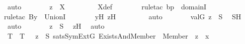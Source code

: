 \begin{isabellebody}
\ auto\isanewline
\ \ \ \ \isamarkupfalse%
\ \isamarkupfalse%
\ {\isachardoublequoteopen}z{\isacharprime}{\kern0pt}\ {\isasymin}\ X{\isachardoublequoteclose}\ \isanewline
\ \ \ \ \ \ \isamarkupfalse%
\ X{\isacharunderscore}{\kern0pt}def\ \isanewline
\ \ \ \ \ \ \isamarkupfalse%
{\isacharparenleft}{\kern0pt}rule{\isacharunderscore}{\kern0pt}tac\ b{\isacharequal}{\kern0pt}p\ \ domainI{\isacharparenright}{\kern0pt}\isanewline
\ \ \ \ \ \ \isamarkupfalse%
{\isacharparenleft}{\kern0pt}rule{\isacharunderscore}{\kern0pt}tac\ B{\isacharequal}{\kern0pt}y{\isacharprime}{\kern0pt}\ \ UnionI{\isacharparenright}{\kern0pt}\isanewline
\ \ \ \ \ \ \isamarkupfalse%
\ y{\isacharprime}{\kern0pt}H\ z{\isacharprime}{\kern0pt}H\ \isanewline
\ \ \ \ \ \ \isamarkupfalse%
\ auto\isanewline
\ \ \ \ \isamarkupfalse%
\ \isamarkupfalse%
\ {\isachardoublequoteopen}val{\isacharparenleft}{\kern0pt}G{\isacharcomma}{\kern0pt}\ z{\isacharprime}{\kern0pt}{\isacharparenright}{\kern0pt}\ {\isasymin}\ S{\isachardoublequoteclose}\ \isamarkupfalse%
\ SH\ \isamarkupfalse%
\ auto\isanewline
\ \ \ \ \isamarkupfalse%
\ \isamarkupfalse%
\ {\isachardoublequoteopen}z\ {\isasymin}\ S{\isachardoublequoteclose}\ \isamarkupfalse%
\ z{\isacharprime}{\kern0pt}H\ \isamarkupfalse%
\ auto\isanewline
\ \ \isamarkupfalse%
\isanewline
\isanewline
\ \ \isamarkupfalse%
\ T\ \ {\isachardoublequoteopen}T\ {\isasymequiv}\ {\isacharbraceleft}{\kern0pt}\ z\ {\isasymin}\ S{\isachardot}{\kern0pt}\ sats{\isacharparenleft}{\kern0pt}SymExt{\isacharparenleft}{\kern0pt}G{\isacharparenright}{\kern0pt}{\isacharcomma}{\kern0pt}\ Exists{\isacharparenleft}{\kern0pt}And{\isacharparenleft}{\kern0pt}Member{\isacharparenleft}{\kern0pt}{}{\isacharcomma}{\kern0pt}\ {}{\isacharparenright}{\kern0pt}{\isacharcomma}{\kern0pt}\ Member{\isacharparenleft}{\kern0pt}{}{\isacharcomma}{\kern0pt}\ {}{\isacharparenright}{\kern0pt}{\isacharparenright}{\kern0pt}{\isacharparenright}{\kern0pt}{\isacharcomma}{\kern0pt}\ {\isacharbrackleft}{\kern0pt}z{\isacharbrackright}{\kern0pt}\ {\isacharat}{\kern0pt}\ {\isacharbrackleft}{\kern0pt}x{\isacharbrackright}{\kern0pt}{\isacharparenright}{\kern0pt}\ {\isacharbraceright}{\kern0pt}{\isachardoublequoteclose}\ \isanewline
\ \ \isamarkupfalse%

\end{isabellebody}
